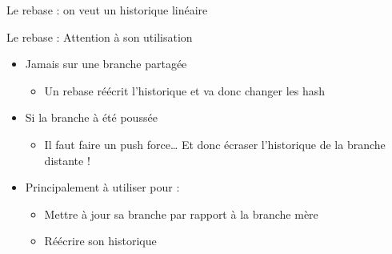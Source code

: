 \documentclass[xcolor=x11names,compress]{beamer}
\begin{document}
\begin{frame}{Le rebase : on veut un historique linéaire}
	\begin{figure}[H]
	\end{figure}
\end{frame}
\begin{frame}{Le rebase : Attention à son utilisation}
	\begin{itemize}
		\item Jamais sur une branche partagée
			\begin{itemize}
				\item Un rebase réécrit l'historique et va donc changer les hash
			\end{itemize}
			\vfill
		\item Si la branche à été poussée
			\begin{itemize}
				\item Il faut faire un push force… Et donc écraser l'historique de la branche distante !
			\end{itemize}
			\vfill
		\item Principalement à utiliser pour : 
			\begin{itemize}
				\item Mettre à jour sa branche par rapport à la branche mère
				\item Réécrire son historique
			\end{itemize}
			\vfill
	\end{itemize}
\end{frame}
\end{document}
